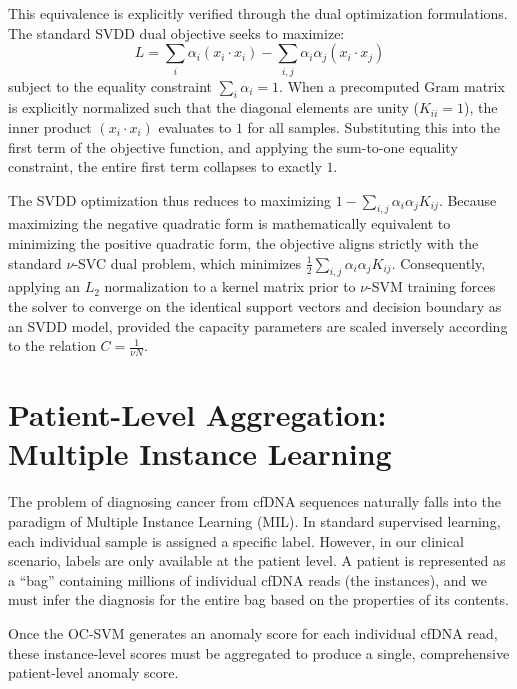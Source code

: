 This equivalence is explicitly verified through the dual optimization formulations. The standard SVDD dual objective seeks to maximize:
$$L=\sum_{i}\alpha_{i}(x_{i}\cdot x_{i})-\sum_{i,j}\alpha_{i}\alpha_{j}(x_{i}\cdot x_{j})$$
subject to the equality constraint $\sum_{i}\alpha_{i}=1$. When a precomputed Gram matrix is explicitly normalized such that the diagonal elements are unity ($K_{ii}=1$), the inner product $(x_{i}\cdot x_{i})$ evaluates to $1$ for all samples. 
Substituting this into the first term of the objective function, and applying the sum-to-one equality constraint, the entire first term collapses to exactly $1$.

The SVDD optimization thus reduces to maximizing $1-\sum_{i,j}\alpha_{i}\alpha_{j}K_{ij}$. 
Because maximizing the negative quadratic form is mathematically equivalent to minimizing the positive quadratic form, the objective aligns strictly with the standard $\nu$-SVC dual problem, which minimizes $\frac{1}{2}\sum_{i,j}\alpha_{i}\alpha_{j}K_{ij}$. 
Consequently, applying an $L_2$ normalization to a kernel matrix prior to $\nu$-SVM training forces the solver to converge on the identical support vectors and decision boundary as an SVDD model, provided the capacity parameters are scaled inversely according to the relation $C=\frac{1}{\nu N}$.

\section{Patient-Level Aggregation: Multiple Instance Learning}\label{sec:mil}

The problem of diagnosing cancer from cfDNA sequences naturally falls into the paradigm of Multiple Instance Learning (MIL). In standard supervised learning, each individual sample is assigned a specific label. However, in our clinical scenario, labels are only available at the patient level. A patient is represented as a ``bag'' containing millions of individual cfDNA reads (the instances), and we must infer the diagnosis for the entire bag based on the properties of its contents.

Once the OC-SVM generates an anomaly score for each individual cfDNA read, these instance-level scores must be aggregated to produce a single, comprehensive patient-level anomaly score. 